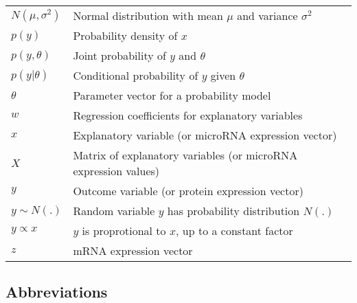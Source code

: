 \documentclass[english,12pt,a4paper,pdftex,elec,utf8]{aaltothesis}
\begin{document}
\begin{tabular}{ll}
$N(\mu,\sigma^2)$ & Normal distribution with mean $\mu$ and variance $\sigma^2$ \\
$p(y)$            & Probability density of $x$ \\
$p(y,\theta)$     & Joint probability of $y$ and $\theta$ \\
$p(y|\theta)$     & Conditional probability of $y$ given $\theta$ \\
$\theta$          & Parameter vector for a probability model \\
$w$               & Regression coefficients for explanatory variables \\
$x$               & Explanatory variable (or microRNA expression vector) \\
$X$               & Matrix of explanatory variables (or microRNA expression values) \\
$y$               & Outcome variable (or protein expression vector) \\
$y \sim N(.)$     & Random variable $y$ has probability distribution $N(.)$ \\
$y \propto x$     & $y$ is proprotional to $x$, up to a constant factor \\
$z$               & mRNA expression vector
\end{tabular}


\subsection*{Abbreviations}
\end{document}
